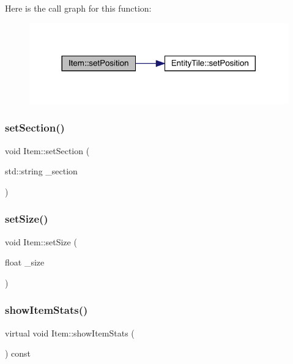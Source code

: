 Here is the call graph for this function\+:
\nopagebreak
\begin{figure}[H]
\begin{center}
\leavevmode
\includegraphics[width=317pt]{dc/d32/class_item_af8f03acf491fb71ec8cf1e4248bb4b3d_cgraph}
\end{center}
\end{figure}
\mbox{\label{class_item_a87100c3d13e81e42e58969f817d591ef}} 
\subsubsection{\texorpdfstring{set\+Section()}{setSection()}}
{\footnotesize\ttfamily void Item\+::set\+Section (\begin{DoxyParamCaption}\item[{std\+::string}]{\+\_\+section }\end{DoxyParamCaption})}

\mbox{\label{class_item_a5ec923033eeb77f331c8307ef5141fc4}} 
\subsubsection{\texorpdfstring{set\+Size()}{setSize()}}
{\footnotesize\ttfamily void Item\+::set\+Size (\begin{DoxyParamCaption}\item[{float}]{\+\_\+size }\end{DoxyParamCaption})}

\mbox{\label{class_item_aaf7dae41afdce432c11261043e8e4e30}} 
\subsubsection{\texorpdfstring{show\+Item\+Stats()}{showItemStats()}}
{\footnotesize\ttfamily virtual void Item\+::show\+Item\+Stats (\begin{DoxyParamCaption}{ }\end{DoxyParamCaption}) const\hspace{0.3cm}{\ttfamily [pure virtual]}}



